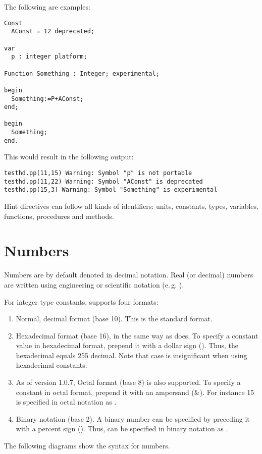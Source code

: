 The following are examples:
\begin{verbatim}
Const
  AConst = 12 deprecated;

var
  p : integer platform;

Function Something : Integer; experimental;

begin
  Something:=P+AConst;
end;

begin
  Something;
end.
\end{verbatim}
This would result in the following output:
\begin{verbatim}
testhd.pp(11,15) Warning: Symbol "p" is not portable
testhd.pp(11,22) Warning: Symbol "AConst" is deprecated
testhd.pp(15,3) Warning: Symbol "Something" is experimental
\end{verbatim}

Hint directives can follow all kinds of identifiers:
units, constants, types, variables, functions, procedures and methods.

\section{Numbers}
Numbers are by default denoted in decimal notation.
Real (or decimal) numbers are written using engineering or scientific
notation (e.\,g. ).

For integer type constants, \fpc supports four formats:
\begin{enumerate}
\item Normal, decimal format (base 10). This is the standard
format.
\item Hexadecimal format (base 16), in the same way as \tp does.
To specify a constant value in hexadecimal format, prepend it with a dollar
sign (\var{\$}). Thus, the hexadecimal  equals 255 decimal.
Note that case is insignificant when using hexadecimal constants.
\item As of version 1.0.7, Octal format (base 8) is also supported.
To specify a constant in octal format, prepend it with an ampersand (\&).
For instance 15 is specified in octal notation as
.
\item Binary notation (base 2). A binary number can be specified
by preceding it with a percent sign (\var{\%}). Thus,  can be
specified in binary notation as .
\end{enumerate}
The following diagrams show the syntax for numbers.



